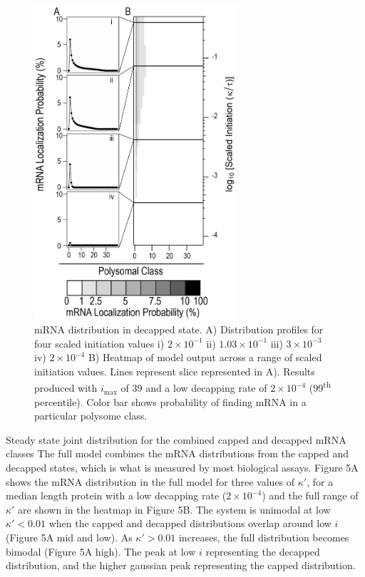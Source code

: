 \documentclass[a4,center,fleqn,nocrop]{NAR}
\newcommand{\imax}{\ensuremath{{i_{\max}}}\xspace}
\begin{document}
\begin{figure}[!ht]
\begin{center}
\includegraphics[width=75mm]{Images/2023-07-04_Marked_slices.png}
\caption{mRNA distribution in decapped state. A) Distribution profiles for four scaled initiation values i) $2\times 10^{-1}$ ii) $1.03\times 10^{-1}$ iii) $3\times 10^{-3}$ iv) $2\times 10^{-4}$ B) Heatmap of model output across a range of scaled initiation values. Lines represent slice represented in A). Results produced with \imax of 39 and a low decapping rate of $2\times10^{-4}$  (99\textsuperscript{th} percentile). Color bar shows probability of finding mRNA in a particular polysome class.}
\end{center}
\end{figure}


Steady state joint distribution for the combined capped and decapped mRNA classes
The full model combines the mRNA distributions from the capped and decapped states, which is what is measured by most biological assays.
Figure 5A shows the mRNA distribution in the full model for three values of $\kappa'$, for a median length protein with a low decapping rate ($2\times10^{-4}$) and the full range of $\kappa'$ are shown in the heatmap in Figure 5B.
The system is unimodal at low $\kappa'<0.01$ when the capped and decapped distributions overlap around low $i$ (Figure 5A mid and low). 
As $\kappa'>0.01$ increases, the full distribution becomes bimodal (Figure 5A high).
The peak at low $i$ representing the decapped distribution, and the higher gaussian peak representing the capped distribution. 
\end{document}
